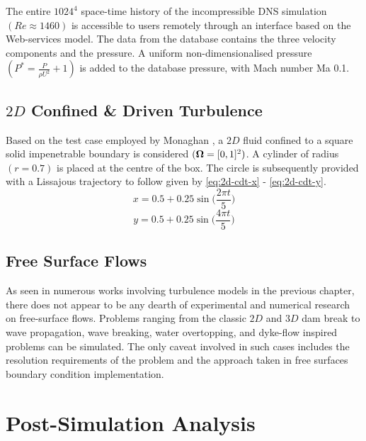 The entire $1024^4$ space-time history of the incompressible DNS simulation $(Re\approx1460)$ is accessible to users remotely through an interface based on the Web-services model. 
The data from the database contains the three velocity components and the pressure. A uniform non-dimensionalised pressure $(P^* = \frac{P}{\rho U^2} + 1)$ is added to the
database pressure, with Mach number Ma 0.1. 

\subsection{$2D$ Confined \& Driven Turbulence}
Based on the test case employed by Monaghan \parencite{Monaghan2017}, a $2D$ fluid confined to a square solid impenetrable boundary is considered $(\bm{\Omega} = [0,1]^2)$. A cylinder of radius $(r=0.7)$ is placed at the centre of the box. The circle is subsequently provided with a Lissajous trajectory to follow given by \ref{eq:2d-cdt-x} - \ref{eq:2d-cdt-y}.
\begin{equation}
    x = 0.5 + 0.25 \sin \bigg( \frac{2\pi t}{5} \bigg)
    \label{eq:2d-cdt-x}
\end{equation}
\begin{equation}
    y = 0.5 + 0.25 \sin \bigg( \frac{4\pi t}{5} \bigg)
    \label{eq:2d-cdt-y}
\end{equation}

\subsection{Free Surface Flows}
As seen in numerous works involving turbulence models in the previous chapter, there does not appear to be any dearth of experimental and numerical research on free-surface flows. Problems ranging from the classic $2D$ and $3D$ dam break to wave propagation, wave breaking, water overtopping, and dyke-flow inspired problems can be simulated. The only caveat involved in such cases includes the resolution requirements of the problem and the approach taken in free surfaces boundary condition implementation.

\section{Post-Simulation Analysis}
